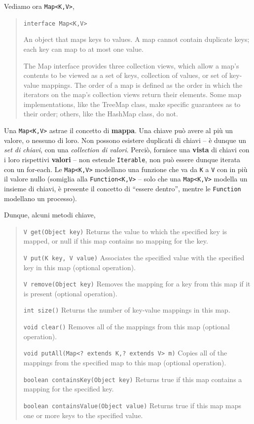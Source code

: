 \documentclass[\fontsizeclass,twocolumn]{\classname}
\theoremstyle{definition}
\theoremstyle{definition}
\begin{document}
Vediamo ora \texttt{Map<K,V>},
\begin{quote}
    \footnotesize{\texttt{interface Map<K,V>}

An object that maps keys to values. A map cannot contain duplicate keys; each key can map to at most one value.

The Map interface provides three collection views, which allow a map's contents to be viewed as a set of keys, collection of values, or set of key-value mappings. The order of a map is defined as the order in which the iterators on the map's collection views return their elements. Some map implementations, like the TreeMap class, make specific guarantees as to their order; others, like the HashMap class, do not.
}
\end{quote}

Una \texttt{Map<K,V>} astrae il concetto di \textbf{mappa}. Una chiave può
avere al più un valore, o nessuno di loro. Non possono esistere duplicati di
chiavi -- è dunque un \emph{set di chiavi}, con una \emph{collection di
valori}. Perciò, fornisce una \textbf{vista} di chiavi con i loro rispettivi
\textbf{valori} -- non estende \texttt{Iterable}, non può essere dunque iterata
con un for\--each. Le \texttt{Map<K,V>} modellano una funzione che va da
\texttt{K} a \texttt{V} con in più il valore nullo (somiglia alla
\texttt{Function<K,V>} -- solo che una \texttt{Map<K,V>} modella un insieme di
chiavi, è presente il concetto di ``essere dentro'', mentre le
\texttt{Function} modellano un processo).

Dunque, alcuni metodi chiave,
\begin{quote}
    \footnotesize{\texttt{V 	get(Object key)} 	Returns the value to which the specified key is mapped, or null if this map contains no mapping for the key.

\texttt{V 	put(K key, V value)} 	Associates the specified value with the specified key in this map (optional operation).

\texttt{V 	remove(Object key)} 	Removes the mapping for a key from this map if it is present (optional operation).

\texttt{int 	size()} 	Returns the number of key-value mappings in this map.

\texttt{void 	clear()} 	Removes all of the mappings from this map (optional operation).

\texttt{void 	putAll(Map<? extends K,? extends V> m)} 	Copies all of the mappings from the specified map to this map (optional operation).

\texttt{boolean 	containsKey(Object key)} 	Returns true if this map contains a mapping for the specified key.

\texttt{boolean 	containsValue(Object value)} 	Returns true if this map maps one or more keys to the specified value.

}
\end{quote}
\end{document}
